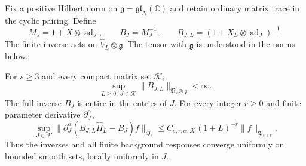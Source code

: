 Fix a positive Hilbert norm on $\mathfrak g=\mathfrak{gl}_N(\mathbb C)$
and retain ordinary matrix trace in the cyclic pairing. Define
\[
 M_J=1+X\otimes\operatorname{ad}_J,\qquad
 B_J=M_J^{-1},\qquad
 B_{J,L}=(1+X_L\otimes\operatorname{ad}_J)^{-1}.
\]
The finite inverse acts on $\widehat V_L\otimes\mathfrak g$.
The tensor with $\mathfrak g$ is understood in the norms below.

\begin{theorem}\label{mht:thm:uniform-staggered-inverse}
For $s\geq3$ and every compact matrix set $\mathcal K$,
\[
 \sup_{L\geq0,\ J\in\mathcal K}
       \|B_{J,L}\|_{\mathfrak V_s\otimes\mathfrak g}<\infty.
\]
The full inverse $B_J$ is entire in the entries of $J$.
For every integer $r\geq0$ and finite parameter derivative
$\partial_J^\alpha$,
\begin{equation}\label{mht:eq:staggered-inverse-rate}
 \sup_{J\in\mathcal K}
 \|\partial_J^\alpha(B_{J,L}\widehat\Pi_L-B_J)f\|_{\mathfrak V_s}
 \leq C_{s,r,\alpha,\mathcal K}(1+L)^{-r}
                              \|f\|_{\mathfrak V_{s+r}}.
\end{equation}
Thus the inverses and all finite background responses converge
uniformly on bounded smooth sets, locally uniformly in $J$.
\end{theorem}

